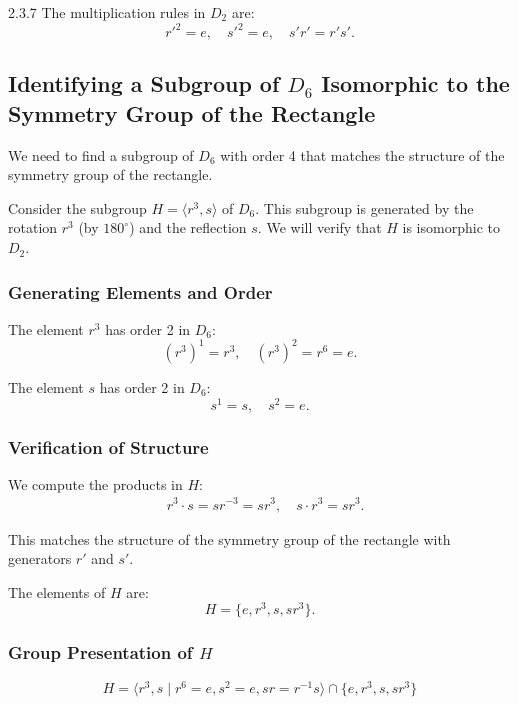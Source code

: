 \documentclass[12pt]{amsart}
\theoremstyle{definition}
\numberwithin{equation}{section}
\begin{document}
\begin{exercise}{2.3.7}
    The multiplication rules in \(D_2\) are:
    \[
    r'^2 = e, \quad s'^2 = e, \quad s'r' = r's'.
    \]
    
    \subsection*{Identifying a Subgroup of \(D_6\) Isomorphic to the Symmetry Group of the Rectangle}
    
    We need to find a subgroup of \(D_6\) with order 4 that matches the structure of the symmetry group of the rectangle.
    
    Consider the subgroup \(H = \langle r^3, s \rangle\) of \(D_6\). This subgroup is generated by the rotation \(r^3\) (by \(180^\circ\)) and the reflection \(s\). We will verify that \(H\) is isomorphic to \(D_2\).
    
    \subsubsection*{Generating Elements and Order}
    
    The element \(r^3\) has order 2 in \(D_6\):
    \[
    (r^3)^1 = r^3, \quad (r^3)^2 = r^6 = e.
    \]
    
    The element \(s\) has order 2 in \(D_6\):
    \[
    s^1 = s, \quad s^2 = e.
    \]
    
    \subsubsection*{Verification of Structure}
    
    We compute the products in \(H\):
    \[
    \begin{aligned}
    &r^3 \cdot s = sr^{-3} = sr^3, \quad s \cdot r^3 = sr^3.
    \end{aligned}
    \]
    
    This matches the structure of the symmetry group of the rectangle with generators \(r'\) and \(s'\).
    
    The elements of \(H\) are:
    \[
    H = \{e, r^3, s, sr^3\}.
    \]
    
    \subsubsection*{Group Presentation of \(H\)}
    
    \[
    H = \langle r^3, s \mid r^6 = e, s^2 = e, sr = r^{-1}s \rangle \cap \{e, r^3, s, sr^3\}
    \]
    

\end{exercise}
\end{document}
